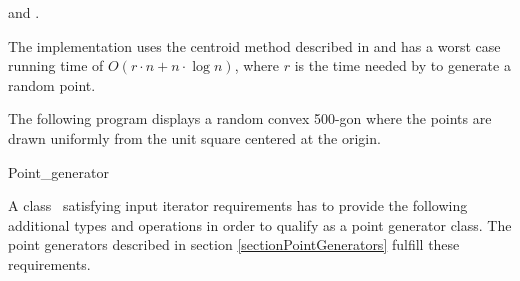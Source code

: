 
\ccSeeAlso {} and
.

\ccImplementation The implementation uses the centroid method
described in \cite{s-zkm-96} and has a worst case running time of $O(r
\cdot n + n \cdot \log n)$, where $r$ is the time needed by 
to generate a random point.

\ccExample

The following program displays a random convex 500-gon where the
points are drawn uniformly from the unit square centered at the
origin.


\ccTagDefaults

\begin{ccClass}{Point_generator}
     \ccTagFullDeclarations
    
    \label{point_generator_req}
    \ccModifierCrossRefOff
    \ccModifierCrossRefOn
    
    \ccDefinition A class \ccClassName\ satisfying input iterator
    requirements has to provide the following additional types and
    operations in order to qualify as a point generator class. The
    point generators described in section \ref{sectionPointGenerators}
    fulfill these requirements.

    \ccTypes\ccIndexClassTypes
    
    

    \ccOperations
    \begin{ccIndexMemberFunctions}
    
    \end{ccIndexMemberFunctions}
    
\end{ccClass}

